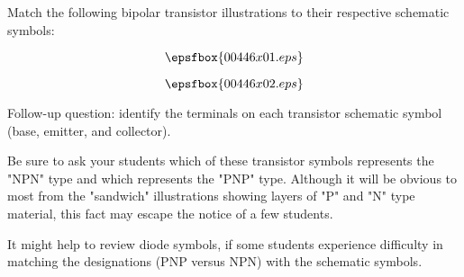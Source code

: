 

Match the following bipolar transistor illustrations to their respective schematic symbols:

$$\epsfbox{00446x01.eps}$$







$$\epsfbox{00446x02.eps}$$
 
\vskip 10pt

Follow-up question: identify the terminals on each transistor schematic symbol (base, emitter, and collector).







Be sure to ask your students which of these transistor symbols represents the "NPN" type and which represents the "PNP" type.  Although it will be obvious to most from the "sandwich" illustrations showing layers of "P" and "N" type material, this fact may escape the notice of a few students.

It might help to review diode symbols, if some students experience difficulty in matching the designations (PNP versus NPN) with the schematic symbols.




